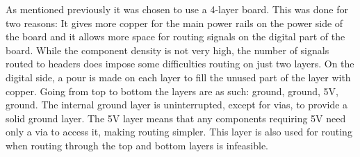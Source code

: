 
As mentioned previously it was chosen to use a 4-layer board.
This was done for two reasons: It gives more copper for the main power rails on the power side of the board and it allows more space for routing signals on the digital part of the board.
While the component density is not very high, the number of signals routed to headers does impose some difficulties routing on just two layers.
On the digital side, a pour is made on each layer to fill the unused part of the layer with copper.
Going from top to bottom the layers are as such: ground, ground, 5V, ground.
The internal ground layer is uninterrupted, except for vias, to provide a solid ground layer.
The 5V layer means that any components requiring 5V need only a via to access it, making routing simpler.
This layer is also used for routing when routing through the top and bottom layers is infeasible.



